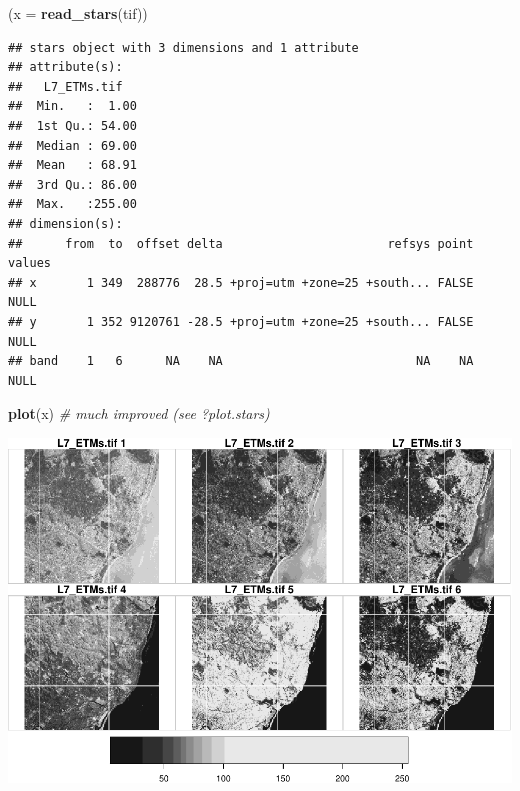 \documentclass[]{article}
\newenvironment{Shaded}{\begin{snugshade}}{\end{snugshade}}
\newcommand{\CommentTok}[1]{\textcolor[rgb]{0.56,0.35,0.01}{\textit{#1}}}
\newcommand{\DataTypeTok}[1]{\textcolor[rgb]{0.13,0.29,0.53}{#1}}
\newcommand{\DecValTok}[1]{\textcolor[rgb]{0.00,0.00,0.81}{#1}}
\newcommand{\KeywordTok}[1]{\textcolor[rgb]{0.13,0.29,0.53}{\textbf{#1}}}
\newcommand{\NormalTok}[1]{#1}
\newcommand{\OperatorTok}[1]{\textcolor[rgb]{0.81,0.36,0.00}{\textbf{#1}}}
\newcommand{\StringTok}[1]{\textcolor[rgb]{0.31,0.60,0.02}{#1}}
\begin{document}
\begin{Shaded}
\begin{Highlighting}[]
\NormalTok{(}\DataTypeTok{x =} \KeywordTok{read_stars}\NormalTok{(tif))}
\end{Highlighting}
\end{Shaded}

\begin{verbatim}
## stars object with 3 dimensions and 1 attribute
## attribute(s):
##   L7_ETMs.tif    
##  Min.   :  1.00  
##  1st Qu.: 54.00  
##  Median : 69.00  
##  Mean   : 68.91  
##  3rd Qu.: 86.00  
##  Max.   :255.00  
## dimension(s):
##      from  to  offset delta                       refsys point values
## x       1 349  288776  28.5 +proj=utm +zone=25 +south... FALSE   NULL
## y       1 352 9120761 -28.5 +proj=utm +zone=25 +south... FALSE   NULL
## band    1   6      NA    NA                           NA    NA   NULL
\end{verbatim}

\begin{Shaded}
\begin{Highlighting}[]
\KeywordTok{plot}\NormalTok{(x) }\CommentTok{# much improved (see ?plot.stars)}
\end{Highlighting}
\end{Shaded}

\includegraphics{R_tidyverse_for_geographers_files/figure-latex/unnamed-chunk-35-2.pdf}

\begin{Shaded}
\end{Shaded}
\end{document}

